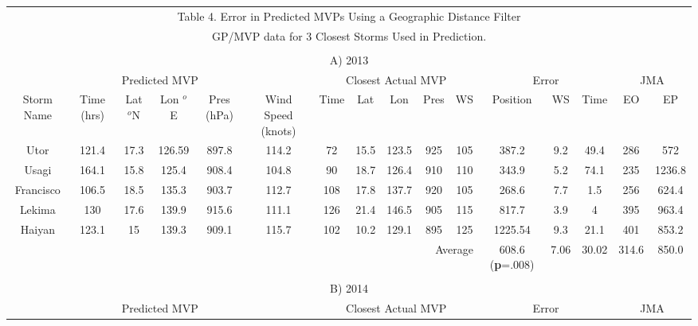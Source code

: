 \documentclass[a4paper, 12pt]{article}
\begin{document}
{\begin{table}[!htpb]
\tiny
\begin{center}
\begin{tabular}{c||c|c|c|c|c||c|c|c|c|c||c|c|c||c|c|}
 \multicolumn{16}{c}{{\small Table 4. Error in Predicted MVPs Using a Geographic Distance Filter}} \\
 \multicolumn{16}{c}{GP/MVP data for 3 Closest Storms Used in Prediction.} \\
  \multicolumn{16}{c}{{}} \\
  \multicolumn{16}{c}{{\small A) 2013}}\\\hline
 \multicolumn{6}{|c||}{Predicted MVP} & \multicolumn{5}{|c||}{Closest Actual MVP}& \multicolumn{3}{|c||}{Error} & \multicolumn{2}{|c|}{JMA}\\
\cline{1-16}
\multicolumn{1}{|m{.15in}||}{Storm Name} & \multicolumn{1}{|m{.3in}|}{Time (hrs)} &\multicolumn{1}{|m{.15in}|}{Lat $^o$N}& \multicolumn{1}{|m{.2in}|}{Lon $^o$E}  & \multicolumn{1}{|m{.3in}|}{Pres (hPa)} &  \multicolumn{1}{|m{.2in}||}{Wind Speed (knots)} & Time & Lat & Lon & Pres & WS & Position & WS & Time &   EO &EP  \\\hline
\multicolumn{1}{|c||}{Utor} & 121.4 & 17.3 & 126.59 & 897.8 & 114.2 & 72 & 15.5 & 123.5 & 925 & 105 & 387.2 & 9.2 & 49.4 &286 & 572 \\
\multicolumn{1}{|c||}{Usagi} & 164.1 & 15.8 & 125.4 & 908.4 & 104.8 & 90 & 18.7 & 126.4 & 910 & 110 & 343.9 & 5.2 & 74.1 & 235  & 1236.8  \\
\multicolumn{1}{|c||}{Francisco} & 106.5 & 18.5 & 135.3 & 903.7 & 112.7 & 108 & 17.8 & 137.7 & 920 & 105 & 268.6 & 7.7 & 1.5 & 256  & 624.4  \\
\multicolumn{1}{|c||}{Lekima} & 130 & 17.6 & 139.9 & 915.6 & 111.1 & 126 & 21.4 & 146.5 & 905 & 115 & 817.7 & 3.9 & 4 & 395   & 963.4  \\
\multicolumn{1}{|c||}{Haiyan} & 123.1 & 15&139.3 & 909.1 & 115.7 &  102 & 10.2 & 129.1 & 895 & 125 & 1225.54 & 9.3 & 21.1 & 401  & 853.2  \\\hline\hline
\multicolumn{11}{|r||}{Average}&\multicolumn{1}{|m{.2in}|}{\vspace{.1in} 608.6 \hspace{.5in} ({\bf p}=.008)} &7.06&30.02&314.6&850.0\\\hline
  \multicolumn{16}{c}{}\\
\multicolumn{16}{c}{{\small B) 2014}} \\\hline
\multicolumn{6}{|c||}{Predicted MVP} & \multicolumn{5}{|c||}{Closest Actual MVP}& \multicolumn{3}{|c||}{Error} & \multicolumn{2}{|c|}{JMA}\\\hline

\end{tabular}
\end{center}
\end{table}}
\end{document}
